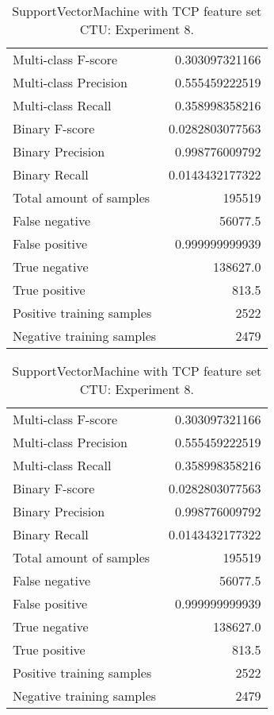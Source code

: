 \begin{table}[H]
\begin{minipage}{0.5\textwidth}
\caption{SupportVectorMachine with TCP feature set CTU: Experiment 7.}
\centering
\begin{tabular}{l r}
\toprule
Multi-class F-score & 0.303097321166 \\
Multi-class Precision & 0.555459222519 \\
Multi-class Recall & 0.358998358216 \\
\midrule
Binary F-score & 0.0282803077563 \\
Binary Precision & 0.998776009792 \\
Binary Recall & 0.0143432177322 \\
\midrule
Total amount of samples & 195519 \\
False negative & 56077.5 \\
False positive & 0.999999999939 \\
True negative & 138627.0 \\
True positive & 813.5 \\
\midrule
Positive training samples & 2522 \\
Negative training samples & 2479 \\
\bottomrule
\end{tabular}
\end{minipage}
\hfillx
\begin{minipage}{0.5\textwidth}
\caption{SupportVectorMachine with TCP feature set CTU: Experiment 8.}
\centering
\begin{tabular}{l r}
\toprule
Multi-class F-score & 0.303097321166 \\
Multi-class Precision & 0.555459222519 \\
Multi-class Recall & 0.358998358216 \\
\midrule
Binary F-score & 0.0282803077563 \\
Binary Precision & 0.998776009792 \\
Binary Recall & 0.0143432177322 \\
\midrule
Total amount of samples & 195519 \\
False negative & 56077.5 \\
False positive & 0.999999999939 \\
True negative & 138627.0 \\
True positive & 813.5 \\
\midrule
Positive training samples & 2522 \\
Negative training samples & 2479 \\
\bottomrule
\end{tabular}
\end{minipage}
\end{table}
